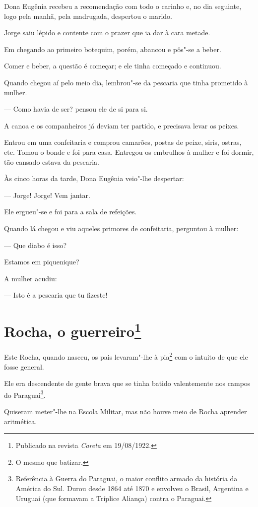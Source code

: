 Dona Eugênia recebeu a recomendação com todo o carinho e, no dia
seguinte, logo pela manhã, pela madrugada, despertou o marido.

Jorge saiu lépido e contente com o prazer que ia dar à cara metade.

Em chegando ao primeiro botequim, porém, abancou e pôs"-se a beber.

Comer e beber, a questão é começar; e ele tinha começado e continuou.

Quando chegou aí pelo meio dia, lembrou"-se da pescaria que tinha
prometido à mulher.

--- Como havia de ser? pensou ele de si para si.

A canoa e os companheiros já deviam ter partido, e precisava levar os
peixes.

Entrou em uma confeitaria e comprou camarões, postas de peixe, siris,
ostras, etc. Tomou o bonde e foi para casa. Entregou os embrulhos à
mulher e foi dormir, tão cansado estava da pescaria.

Às cinco horas da tarde, Dona Eugênia veio"-lhe despertar:

--- Jorge! Jorge! Vem jantar.

Ele ergueu"-se e foi para a sala de refeições.

Quando lá chegou e viu aqueles primores de confeitaria, perguntou à
mulher:

--- Que diabo é isso?

Estamos em piquenique?

A mulher acudiu:

--- Isto é a pescaria que tu fizeste!



\chapter[Rocha, o guerreiro]{Rocha, o guerreiro\footnote[*]{Publicado na revista \emph{Careta} em 19/08/1922.}}

Este Rocha, quando nasceu, os pais levaram"-lhe à pia\footnote{O mesmo
  que batizar.} com o intuito de que ele fosse general.

Ele era descendente de gente brava que se tinha batido valentemente nos
campos do Paraguai\footnote{Referência à Guerra do Paraguai, o maior
  conflito armado da história da América do Sul. Durou desde 1864 até
  1870 e envolveu o Brasil, Argentina e Uruguai (que formavam a Tríplice
  Aliança) contra o Paraguai.}.

Quiseram meter"-lhe na Escola Militar, mas não houve meio de Rocha
aprender aritmética.

